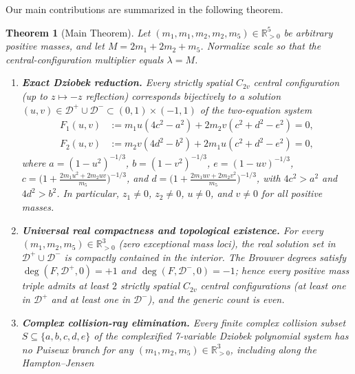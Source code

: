 \documentclass[11pt,a4paper]{amsart}
\newtheorem{theorem}{Theorem}[section]
\theoremstyle{definition}
\theoremstyle{remark}
\newcommand{\R}{\mathbb{R}}
\begin{document}
Our main contributions are summarized in the following theorem.

\begin{theorem}[Main Theorem]\label{thm:main}
Let $(m_1, m_1, m_2, m_2, m_5) \in \R_{>0}^5$ be arbitrary positive masses, and let
$M = 2m_1 + 2m_2 + m_5$. Normalize scale so that the central-configuration multiplier
equals $\lambda = M$.
\begin{enumerate}[label=\textup{(\arabic*)}]
  \item \textbf{Exact Dziobek reduction.} Every strictly spatial $C_{2v}$ central
        configuration (up to $z \mapsto -z$ reflection) corresponds bijectively to a
        solution $(u,v) \in \mathcal{D}^+ \cup \mathcal{D}^- \subset (0,1) \times (-1,1)$
        of the two-equation system
        \begin{equation}\label{eq:dziobek-2var}
        \begin{aligned}
          F_1(u,v) &:= m_1 u (4 c^2 - a^2) + 2 m_2 v (c^2 + d^2 - e^2) = 0,\\
          F_2(u,v) &:= m_2 v (4 d^2 - b^2) + 2 m_1 u (c^2 + d^2 - e^2) = 0,
        \end{aligned}
        \end{equation}
        where $a = (1 - u^2)^{-1/3}$, $b = (1 - v^2)^{-1/3}$, $e = (1 - uv)^{-1/3}$,
        $c = \bigl(1 + \frac{2m_1 u^2 + 2m_2 uv}{m_5}\bigr)^{-1/3}$, and
        $d = \bigl(1 + \frac{2m_1 uv + 2m_2 v^2}{m_5}\bigr)^{-1/3}$, with $4c^2 > a^2$
        and $4d^2 > b^2$. In particular, $z_1 \neq 0$, $z_2 \neq 0$, $u \neq 0$, and
        $v \neq 0$ for all positive masses.
  \item \textbf{Universal real compactness and topological existence.}
        For \emph{every} $(m_1, m_2, m_5) \in \R_{>0}^3$ (zero exceptional mass loci),
        the real solution set in $\mathcal{D}^+ \cup \mathcal{D}^-$ is compactly
        contained in the interior. The Brouwer degrees satisfy
        $\deg(F, \mathcal{D}^+, 0) = +1$ and $\deg(F, \mathcal{D}^-, 0) = -1$; hence
        every positive mass triple admits at least $2$ strictly spatial $C_{2v}$ central
        configurations (at least one in $\mathcal{D}^+$ and at least one in
        $\mathcal{D}^-$), and the generic count is even.
  \item \textbf{Complex collision-ray elimination.}
        Every finite complex collision subset $S \subseteq \{a,b,c,d,e\}$ of the
        complexified 7-variable Dziobek polynomial system has no Puiseux branch for any
        $(m_1, m_2, m_5) \in \R_{>0}^3$, including along the Hampton--Jensen

\end{enumerate}
\end{theorem}
\end{document}
